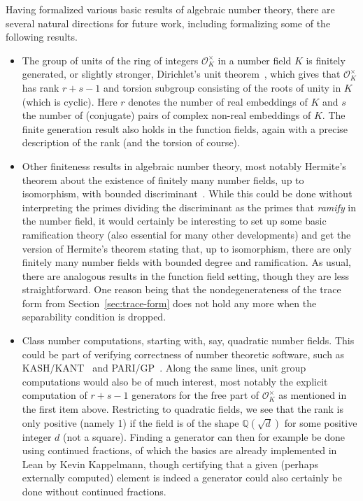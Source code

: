 \documentclass[sn-mathphys]{sn-jnl}%
\newcommand*{\OK}[1][K]{\mathcal{O}_{#1}}
\newcommand{\QQ}{\mathbb{Q}}
\begin{document}
Having formalized various basic results of algebraic number theory, there are several natural directions for future work, including formalizing some of the following results.
\begin{itemize}

\item The group of units of the ring of integers $\OK^{\times}$ in a number field $K$ is finitely generated, or slightly stronger, Dirichlet's unit theorem~\cite[Theorem 7.4]{Neukirch}, which gives that $\OK^{\times}$ has rank $r+s-1$ and torsion subgroup consisting of the roots of unity in $K$ (which is cyclic). Here $r$ denotes the number of real embeddings of $K$ and $s$ the number of (conjugate) pairs of complex non-real embeddings of $K$. The finite generation result also holds in the function fields, again with a precise description of the rank (and the torsion of course).

\item Other finiteness results in algebraic number theory, most notably Hermite's theorem about the existence of finitely many number fields, up to isomorphism,
with bounded discriminant~\cite[Theorem 2.16]{Neukirch}. While this could be done without interpreting the primes dividing the discriminant as the primes that \emph{ramify} in the number field, it would certainly be interesting to set up some basic ramification theory (also essential for many other developments) and get the version of Hermite's theorem stating that, up to isomorphism, there are only finitely many number fields with bounded degree and ramification.
As usual, there are analogous results in the function field setting, though they are less straightforward. One reason being that the nondegenerateness of the trace form from Section~\ref{sec:trace-form} does not hold any more when the separability condition is dropped.

\item Class number computations, starting with, say, quadratic number fields.
This could be part of verifying correctness of number theoretic software, such as KASH/KANT~\cite{kash} and PARI/GP~\cite{PARI2}.
Along the same lines, unit group computations would also be of much interest, most notably the explicit computation of $r+s-1$ generators for the free part of $\OK^{\times}$ as mentioned in the first item above.
Restricting to quadratic fields, we see that the rank is only positive (namely 1) if the field is of the shape $\QQ(\sqrt{d})$ for some positive integer $d$ (not a square).
Finding a generator can then for example be done using continued fractions, of which the basics are already implemented in Lean by Kevin Kappelmann, though certifying that a given (perhaps externally computed) element is indeed a generator could also certainly be done without continued fractions.


\end{itemize}
\end{document}
